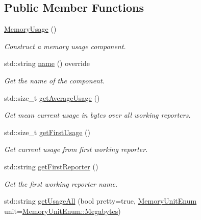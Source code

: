 \subsection*{Public Member Functions}
\begin{DoxyCompactItemize}
\item 
\hyperlink{structvt_1_1util_1_1memory_1_1_memory_usage_a5838280c7b2b24ab8ed2aff450b5e98f}{Memory\+Usage} ()
\begin{DoxyCompactList}\small\item\em Construct a memory usage component. \end{DoxyCompactList}\item 
std\+::string \hyperlink{structvt_1_1util_1_1memory_1_1_memory_usage_abd58d8e05874fa3da64e15fef0b9e87f}{name} () override
\begin{DoxyCompactList}\small\item\em Get the name of the component. \end{DoxyCompactList}\item 
std\+::size\+\_\+t \hyperlink{structvt_1_1util_1_1memory_1_1_memory_usage_a59d87ec931fe37d4300ba72b00e63d8e}{get\+Average\+Usage} ()
\begin{DoxyCompactList}\small\item\em Get mean current usage in bytes over all working reporters. \end{DoxyCompactList}\item 
std\+::size\+\_\+t \hyperlink{structvt_1_1util_1_1memory_1_1_memory_usage_ab02282aab80eb52e5f8f43095af05304}{get\+First\+Usage} ()
\begin{DoxyCompactList}\small\item\em Get current usage from first working reporter. \end{DoxyCompactList}\item 
std\+::string \hyperlink{structvt_1_1util_1_1memory_1_1_memory_usage_a5baf0fd6bf753755c4602fcb91a7c268}{get\+First\+Reporter} ()
\begin{DoxyCompactList}\small\item\em Get the first working reporter name. \end{DoxyCompactList}\item 
std\+::string \hyperlink{structvt_1_1util_1_1memory_1_1_memory_usage_aa37f5b634fb87151fc1688cdba759298}{get\+Usage\+All} (bool pretty=true, \hyperlink{namespacevt_1_1util_1_1memory_a64df3d84293b34009f78e2a1db2f9bb6}{Memory\+Unit\+Enum} unit=\hyperlink{namespacevt_1_1util_1_1memory_a64df3d84293b34009f78e2a1db2f9bb6a2276a1b157f2813f3b65d04c0b1c56f6}{Memory\+Unit\+Enum\+::\+Megabytes})

\end{DoxyCompactItemize}
